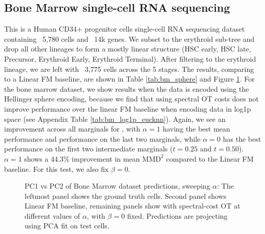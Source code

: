 \subsection{Bone Marrow single-cell RNA sequencing}
This is a Human CD34+ progenitor cells single-cell RNA sequencing dataset containing ~5,780 cells and ~14k genes. We subset to the erythroid sub-tree and drop all other lineages to form a mostly linear structure (HSC early, HSC late, Precursor, Erythroid Early, Erythroid Terminal). After filtering to the erythroid lineage, we are left with ~3,775 cells across the 5 stages. The results, comparing to a Linear FM baseline, are shown in Table \ref{tab:bm_sphere} and Figure \ref{fig:bonemarrow_pca}. For the bone marrow dataset, we show results when the data is encoded using the Hellinger sphere encoding, because we find that using spectral OT costs does not improve performance over the linear FM baseline when encoding data in log1p space (see Appendix Table \ref{tab:bm_log1p_eucknn}). Again, we see an improvement across all marginals for \ourmodel, with \ourmodel $\alpha=1$ having the best mean performance and performance on the last two marginals, while \ourmodel $\alpha=0$ has the best performance on the first two intermediate marginals ($t=0.25$ and $t=0.50$). \ourmodel $\alpha=1$ shows a 44.3\% improvement in mean $\mathrm{MMD}^2$ compared to the Linear FM baseline. For this test, we also fix $\beta=0$.



\begin{figure}[t]
\centering

\caption{PC1 vs PC2 of Bone Marrow dataset predictions, sweeping $\alpha$: The leftmost panel shows the ground truth cells. Second panel shows Linear FM baseline, remaining panels show \ourmodel with spectral-cost OT at different values of $\alpha$, with $\beta=0$ fixed. Predictions are projecting using PCA fit on test cells.}
\label{fig:bonemarrow_pca}
\end{figure}

